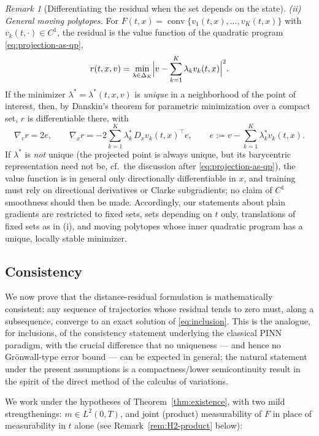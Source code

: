 \documentclass[11pt]{elsarticle}
\theoremstyle{definition}
\theoremstyle{remark}
\newtheorem{remark}[theorem]{Remark}
\numberwithin{equation}{section}
\begin{document}
\begin{remark}[Differentiating the residual when the set depends on the
		state]
		\emph{(ii) General moving polytopes.} For
		$F(t,x)=\operatorname{conv}\{v_1(t,x),\dots,v_K(t,x)\}$ with
		$v_k(t,\cdot)\in C^1$, the residual is the value function of the
		quadratic program \eqref{eq:projection-as-qp},
		\[
		r(t,x,v)
		=\min_{\lambda\in\Delta_K}
		\Bigl|v-\sum_{k=1}^K\lambda_kv_k(t,x)\Bigr|^2 .
		\]
		If the minimizer $\lambda^\ast=\lambda^\ast(t,x,v)$ is \emph{unique}
		in a neighborhood of the point of interest, then, by Danskin's
		theorem for parametric minimization over a compact set, $r$ is
		differentiable there, with
		\[
		\nabla_vr=2e,
		\qquad
		\nabla_xr=-2\sum_{k=1}^K\lambda_k^\ast\,
		D_xv_k(t,x)^{\!\top}e,
		\qquad
		e:=v-\sum_{k=1}^K\lambda_k^\ast v_k(t,x).
		\]
		If $\lambda^\ast$ is \emph{not} unique (the projected point is
		always unique, but its barycentric representation need not be, cf.\
		the discussion after \eqref{eq:projection-as-qp}), the value
		function is in general only directionally differentiable in $x$,
		and training must rely on directional derivatives or Clarke
		subgradients; no claim of $C^1$ smoothness should then be made.
		Accordingly, our statements about plain gradients are restricted to
		fixed sets, sets depending on $t$ only, translations of fixed sets
		as in (i), and moving polytopes whose inner quadratic program has a
		unique, locally stable minimizer.
	\end{remark}
	
	\subsection{Consistency}
	\label{subsec:consistency}
	
	We now prove that the distance-residual formulation is mathematically
	consistent: any sequence of trajectories whose residual tends to zero
	must, along a subsequence, converge to an exact solution of
	\eqref{eq:inclusion}.  This is the analogue, for inclusions, of the
	consistency statement underlying the classical PINN paradigm, with the
	crucial difference that no uniqueness --- and hence no Gr\"onwall-type
	error bound --- can be expected in general; the natural statement under
	the present assumptions is a compactness/lower semicontinuity result in
	the spirit of the direct method of the calculus of variations.
	
	We work under the hypotheses of Theorem~\ref{thm:existence}, with two
	mild strengthenings: $m\in L^2(0,T)$, and joint (product)
	measurability of $F$ in place of measurability in $t$ alone
	(see Remark~\ref{rem:H2-product} below):
	
\end{document}
